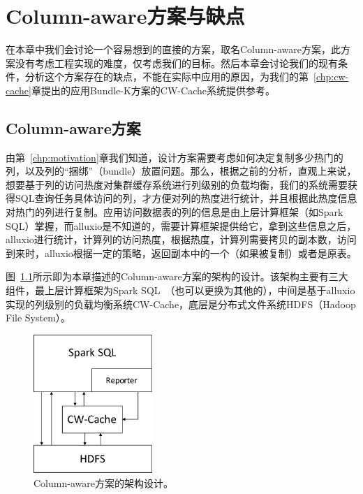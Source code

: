 \chapter{Column-aware方案与缺点}
\label{chp:column-aware}

\par 在本章中我们会讨论一个容易想到的直接的方案，取名Column-aware方案，此方案没有考虑工程实现的难度，仅考虑我们的目标。然后本章会讨论我们的现有条件，分析这个方案存在的缺点，不能在实际中应用的原因，为我们的第~\ref{chp:cw-cache}章提出的应用Bundle-K方案的CW-Cache系统提供参考。

\section{Column-aware方案}

\par 由第~\ref{chp:motivation}章我们知道，设计方案需要考虑如何决定复制多少热门的列，以及列的“捆绑”（bundle）放置问题。那么，根据之前的分析，直观上来说，想要基于列的访问热度对集群缓存系统进行列级别的负载均衡，我们的系统需要获得SQL查询任务具体访问的列，才方便对列的热度进行统计，并且根据此热度信息对热门的列进行复制。应用访问数据表的列的信息是由上层计算框架（如Spark SQL）掌握，而alluxio是不知道的，需要计算框架提供给它，拿到这些信息之后，alluxio进行统计，计算列的访问热度，根据热度，计算列需要拷贝的副本数，访问到来时，alluxio根据一定的策略，返回副本中的一个（如果被复制）或者是原表。

\par 图~\ref{fig:sim-archi}所示即为本章描述的Column-aware方案的架构的设计。该架构主要有三大组件，最上层计算框架为Spark SQL~\cite{spark-sql}（也可以更换为其他的），中间是基于alluxio\cite{alluxio}实现的列级别的负载均衡系统CW-Cache，底层是分布式文件系统HDFS（Hadoop File System）\cite{hdfs}。

\begin{figure}[]
	\centering
	\includegraphics[width=0.4\textwidth]{img/column-aware/sim-archi}
	
	\caption{Column-aware方案的架构设计。}
	\label{fig:sim-archi}
\end{figure}

